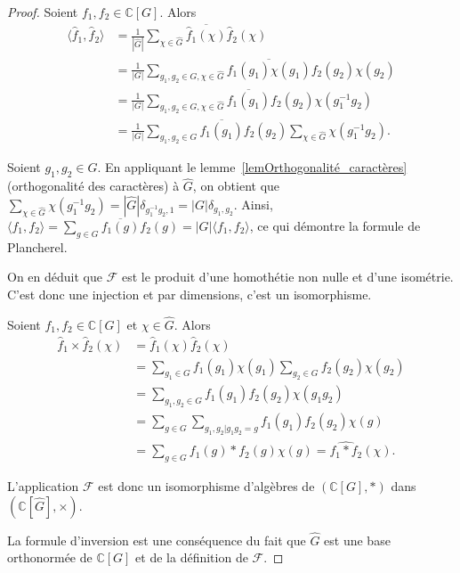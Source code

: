 \documentclass[a4paper]{article}
\theoremstyle{definition} %
\theoremstyle{plain} %
\theoremstyle{remark} %
\newcommand{\C}{\mathbb{C}}
\newcommand{\wg}{\widehat{G}}
\newcommand{\FS}{\mathscr{F}}
\begin{document}
\begin{proof}
Soient $f_1,f_2\in \C[G]$. Alors \[\begin{aligned} \langle\widehat{f}_1,\widehat{f}_2\rangle &=\frac{1}{|\wg|}\sum_{\chi\in \wg} \overline{\widehat{f}_1(\chi)}\widehat{f}_2(\chi)\\ 
&=\frac{1}{|G|}\sum_{g_1,g_2\in G, \chi\in \wg} \overline{f_1(g_1)\chi(g_1)}f_2(g_2)\chi(g_2)\\ 
&= \frac{1}{|G|}\sum_{g_1,g_2\in G, \chi\in \wg}\overline{f_1(g_1)}f_2(g_2)\chi(g_1^{-1}g_2)\\ 
&=\frac{1}{|G|}\sum_{g_1,g_2\in G}\overline{f_1(g_1)}f_2(g_2)\sum_{\chi\in \wg}\chi(g_1^{-1}g_2) .\end{aligned}\]

Soient $g_1,g_2\in G$. En appliquant le lemme~\ref{lemOrthogonalité_caractères} (orthogonalité des caractères) à $\wg$, on obtient que $\sum_{\chi\in \wg} \chi(g_1^{-1}g_2 )=|\wg|\delta_{g_1^{-1}g_2,1}=|G|\delta_{g_1,g_2}$. Ainsi, $\langle f_1,f_2\rangle=\sum_{g\in G}\overline{f_1(g)}f_2(g)=|G|\langle f_1,f_2\rangle$, ce qui démontre la formule de Plancherel.

On en déduit que $\FS$ est le produit d'une homothétie non nulle et d'une isométrie. C'est donc une injection et par dimensions, c'est un isomorphisme. 

Soient $f_1,f_2\in \C[G]$ et $\chi\in \wg$. Alors \[\begin {aligned}\widehat{f}_1\times \widehat{f}_2(\chi) &=\widehat{f}_1(\chi)\widehat{f}_2(\chi)\\ 
&= \sum_{g_1\in G} f_1(g_1)\chi(g_1)\sum_{g_2\in G}f_2(g_2)\chi(g_2)\\ &= \sum_{g_1,g_2\in G}f_1(g_1)f_2(g_2)\chi(g_1g_2)\\ &= \sum_{g\in G} \sum_{g_1,g_2|g_1g_2=g} f_1(g_1)f_2(g_2)\chi(g)\\ 
&=\sum_{g\in G}f_1(g)*f_2(g)\chi(g)=\widehat{f_1*f_2}(\chi).\end{aligned}\]

L'application $\FS$ est donc un isomorphisme d'algèbres de $(\C[G],*)$ dans $(\C[\wg],\times)$.

La formule d'inversion est une conséquence du fait que $\wg$ est une base orthonormée de $\C[G]$ et de la définition de $\FS$.


\end{proof}
\end{document}
